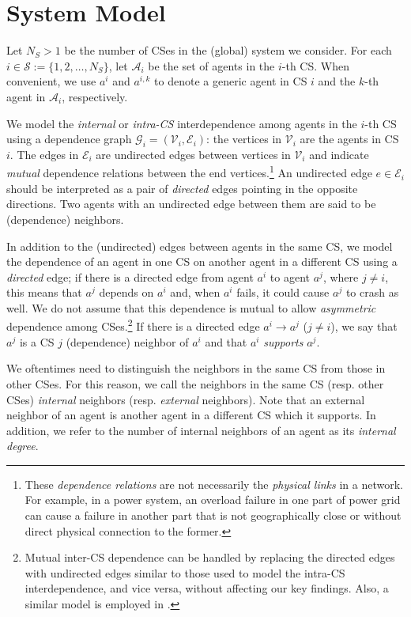 \documentclass[10pt, journal, compsoc]{IEEEtran}
\newcommand {\cA}{{\mathcal{A}}}
\newcommand {\cE}{{\mathcal{E}}}
\newcommand {\cG}{{\mathcal{G}}}
\newcommand {\cS}{{\mathcal{S}}}
\newcommand {\cV}{{\mathcal{V}}}
\begin{document}
\section{System Model}
\label{sec:Model}


Let $N_S > 1$ be the number of CSes in the (global) 
system we consider. For each $i \in \cS := \{1, 2, 
\ldots, N_S\}$, let $\cA_i$ be the set of agents in 
the $i$-th CS. When convenient, we use $a^i$ 
and $a^{i,k}$ to denote a generic agent in CS $i$ 
and the $k$-th agent in $\cA_i$, respectively. 


We model the {\em internal} or {\em intra-CS} 
interdependence among 
agents in the $i$-th CS using a dependence graph 
$\cG_i = (\cV_i, 
\cE_i)$: the vertices in $\cV_i$ are the 
agents in CS $i$. 
The edges in $\cE_i$ are undirected edges between 
vertices in $\cV_i$ and indicate {\em mutual} 
dependence relations between the 
end vertices.\footnote{These {\em dependence 
relations} are not necessarily
the {\em physical links} in a network. For
example, in a power system, an overload failure
in one part of power grid can cause a failure
in another part that is not geographically close
or without direct physical connection to the former.} 
An undirected edge $e \in \cE_i$ should 
be interpreted as a pair of {\em directed} edges 
pointing in the opposite directions. Two agents
with an undirected edge between them are said to be
(dependence) neighbors. 

In addition to the (undirected) edges between agents
in the same CS, we model the dependence of an 
agent in one CS on another agent in a different 
CS using a {\em directed} edge;
if there is a directed edge from agent $a^{i}$ to
agent $a^{j}$, where $j \neq i$, 
this means that $a^j$ depends on $a^i$ and,
when $a^{i}$ fails, it could
cause $a^{j}$ to crash as well. 
We do not assume that this dependence is mutual to 
allow {\em asymmetric} dependence among 
CSes.\footnote{Mutual inter-CS dependence can be 
handled by replacing the directed edges with 
undirected edges similar to those used to model 
the intra-CS interdependence, and vice versa, 
without affecting our key findings. 
Also, a similar model is employed 
in \cite{Kham2016}.} 
If there is a directed edge $a^{i} \to a^{j}$
($j \neq i$), we say that $a^{j}$ is a CS 
$j$ (dependence) neighbor of $a^{i}$ 
and that $a^{i}$ {\em supports} $a^{j}$. 

We oftentimes need to distinguish the neighbors in 
the same CS from those in other CSes. For this reason,  
we call the neighbors 
in the same CS (resp. other CSes) {\em internal} 
neighbors (resp. {\em external} neighbors). Note
that an external neighbor of an agent is another 
agent in a different CS which it supports. 
In addition, we refer to the number of internal
neighbors of an agent as its {\em internal 
degree}. 
\end{document}
